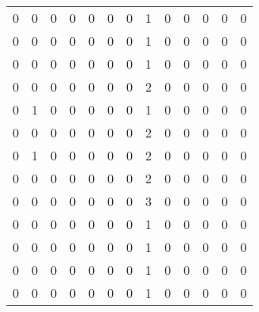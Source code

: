 \begin{tabular}{rrrrrrrrrrrrr}
       0 &       0 &          0 &               0 &                0 &       0 &          0 &          1 &         0 &         0 &      0 &             0 &         0 \\
       0 &       0 &          0 &               0 &                0 &       0 &          0 &          1 &         0 &         0 &      0 &             0 &         0 \\
       0 &       0 &          0 &               0 &                0 &       0 &          0 &          1 &         0 &         0 &      0 &             0 &         0 \\
       0 &       0 &          0 &               0 &                0 &       0 &          0 &          2 &         0 &         0 &      0 &             0 &         0 \\
       0 &       1 &          0 &               0 &                0 &       0 &          0 &          1 &         0 &         0 &      0 &             0 &         0 \\
       0 &       0 &          0 &               0 &                0 &       0 &          0 &          2 &         0 &         0 &      0 &             0 &         0 \\
       0 &       1 &          0 &               0 &                0 &       0 &          0 &          2 &         0 &         0 &      0 &             0 &         0 \\
       0 &       0 &          0 &               0 &                0 &       0 &          0 &          2 &         0 &         0 &      0 &             0 &         0 \\
       0 &       0 &          0 &               0 &                0 &       0 &          0 &          3 &         0 &         0 &      0 &             0 &         0 \\
       0 &       0 &          0 &               0 &                0 &       0 &          0 &          1 &         0 &         0 &      0 &             0 &         0 \\
       0 &       0 &          0 &               0 &                0 &       0 &          0 &          1 &         0 &         0 &      0 &             0 &         0 \\
       0 &       0 &          0 &               0 &                0 &       0 &          0 &          1 &         0 &         0 &      0 &             0 &         0 \\
       0 &       0 &          0 &               0 &                0 &       0 &          0 &          1 &         0 &         0 &      0 &             0 &         0 \\

\end{tabular}
